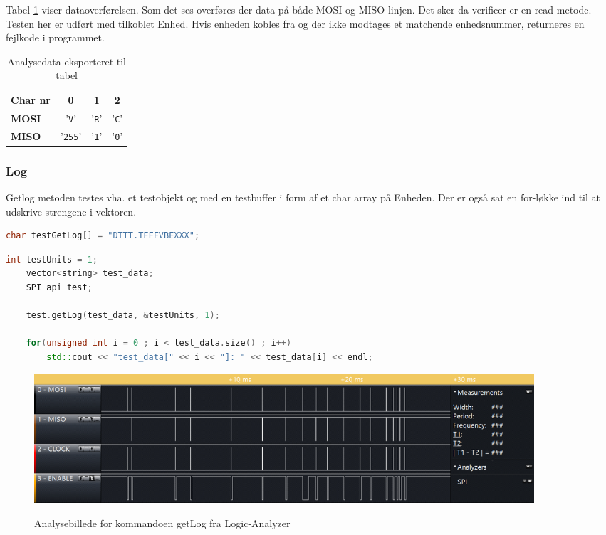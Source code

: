Tabel \ref{table:scop_verify} viser dataoverførelsen. Som det ses overføres der data på både MOSI og MISO linjen. Det sker da verificer er en read-metode. Testen her er udført med tilkoblet Enhed. Hvis enheden kobles fra og der ikke modtages et matchende enhedsnummer, returneres en fejlkode i programmet. 
 

\begin{table}[H]
	\caption{Analysedata eksporteret til tabel}
	\centering
	\begin{tabular}{|l|c|c|c|}
		\hline 
		\textbf{Char nr} & \textbf{0} & \textbf{1} & \textbf{2}\\ 		
		\hline 
		\textbf{MOSI} & '\verb+V+' & '\verb+R+'  & '\verb+C+'\\ 
		\hline 
		\textbf{MISO} & '\verb+255+' & '\verb+1+' & '\verb+0+' \\ 
		\hline 
	\end{tabular} 
	\label{table:scop_verify}
\end{table}



\subsubsection*{Log}
Getlog metoden testes vha. et testobjekt og med en testbuffer i form af et char array på Enheden. Der er også sat en for-løkke ind til at udskrive strengene i vektoren.

\begin{lstlisting}[language=C]
char testGetLog[] = "DTTT.TFFFVBEXXX";
\end{lstlisting}

\begin{lstlisting}[language=C++]
	int testUnits = 1;
	vector<string> test_data;
	SPI_api test;

	test.getLog(test_data, &testUnits, 1);
	
	for(unsigned int i = 0 ; i < test_data.size() ; i++)
		std::cout << "test_data[" << i << "]: " << test_data[i] << endl;
\end{lstlisting}

\begin{figure}[H]
\centering
{\includegraphics[width=0.90\textwidth]{filer/integrationstest/billeder/spi_getlog_and_error}}
\caption{Analysebillede for kommandoen getLog fra Logic-Analyzer}
\label{lab:scop_getlog}
\end{figure}


